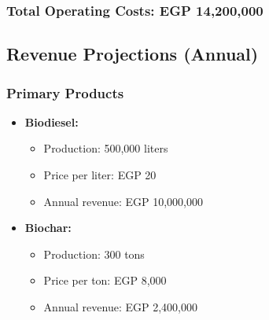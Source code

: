 \subsubsection{Total Operating Costs: EGP 14,200,000}

\subsection{Revenue Projections (Annual)}

\subsubsection{Primary Products}
\begin{itemize}
    \item \textbf{Biodiesel:}
    \begin{itemize}
        \item Production: 500,000 liters
        \item Price per liter: EGP 20
        \item Annual revenue: EGP 10,000,000
    \end{itemize}
    
    \item \textbf{Biochar:}
    \begin{itemize}
        \item Production: 300 tons
        \item Price per ton: EGP 8,000
        \item Annual revenue: EGP 2,400,000
    \end{itemize}
\end{itemize}

